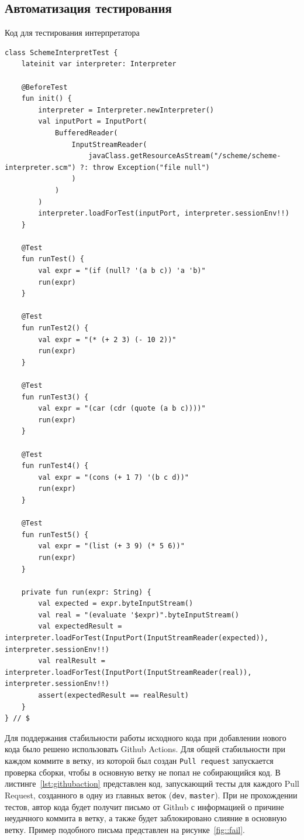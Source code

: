 \documentclass[14pt, russian]{scrartcl}
\newenvironment{longlisting}{\captionsetup{type=listing}}{}
\begin{document}
\begin{longlisting}

\subsection{Автоматизация тестирования}
\caption{Код для тестирования интерпретатора}
\label{lst:testrun}
\begin{verbatim}
class SchemeInterpretTest {
    lateinit var interpreter: Interpreter

    @BeforeTest
    fun init() {
        interpreter = Interpreter.newInterpreter()
        val inputPort = InputPort(
            BufferedReader(
                InputStreamReader(
                    javaClass.getResourceAsStream("/scheme/scheme-interpreter.scm") ?: throw Exception("file null")
                )
            )
        )
        interpreter.loadForTest(inputPort, interpreter.sessionEnv!!)
    }

    @Test
    fun runTest() {
        val expr = "(if (null? '(a b c)) 'a 'b)"
        run(expr)
    }

    @Test
    fun runTest2() {
        val expr = "(* (+ 2 3) (- 10 2))"
        run(expr)
    }

    @Test
    fun runTest3() {
        val expr = "(car (cdr (quote (a b c))))"
        run(expr)
    }

    @Test
    fun runTest4() {
        val expr = "(cons (+ 1 7) '(b c d))"
        run(expr)
    }

    @Test
    fun runTest5() {
        val expr = "(list (+ 3 9) (* 5 6))"
        run(expr)
    }

    private fun run(expr: String) {
        val expected = expr.byteInputStream()
        val real = "(evaluate '$expr)".byteInputStream()
        val expectedResult = interpreter.loadForTest(InputPort(InputStreamReader(expected)), interpreter.sessionEnv!!)
        val realResult = interpreter.loadForTest(InputPort(InputStreamReader(real)), interpreter.sessionEnv!!)
        assert(expectedResult == realResult)
    }
} // $
\end{verbatim}
\end{longlisting}

Для поддержания стабильности работы исходного кода при добавлении нового кода было решено использовать Github Actions.
Для общей стабильности при каждом коммите в ветку, из которой был создан \texttt{Pull request} запускается проверка сборки, чтобы в основную ветку не попал не собирающийся код.
В листинге~\ref{lst:githubaction} представлен код, запускающий тесты для каждого Pull Request, созданного в одну из главных веток (\texttt{dev}, \texttt{master}).
При не прохождении тестов, автор кода будет получит письмо от Github с информацией о причине неудачного коммита в ветку, а также будет заблокировано слияние в основную ветку.
Пример подобного письма представлен на рисунке~\ref{fig::fail}.
\end{document}
